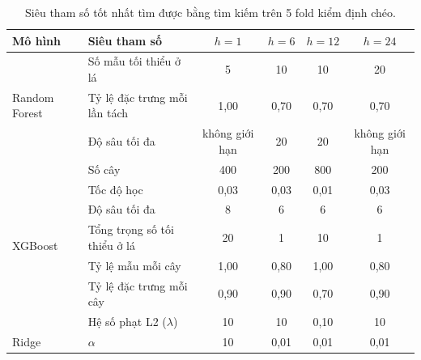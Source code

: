 \begin{table}[htbp]
\centering
\caption[Siêu tham số tối ưu]{Siêu tham số tốt nhất tìm được bằng tìm kiếm trên 5 fold kiểm định chéo.}
\label{tab:best_params}
\footnotesize\setlength{\tabcolsep}{4pt}
\begin{tabular}{|l|l|c|c|c|c|}
\hline
\textbf{Mô hình} & \textbf{Siêu tham số} & \textbf{$h = 1$} & \textbf{$h = 6$} & \textbf{$h = 12$} & \textbf{$h = 24$} \\
\hline
\multirow{3}{*}{Random Forest} & Số mẫu tối thiểu ở lá & 5 & 10 & 10 & 20 \\
\cline{2-6}
 & Tỷ lệ đặc trưng mỗi lần tách & 1{,}00 & 0{,}70 & 0{,}70 & 0{,}70 \\
\cline{2-6}
 & Độ sâu tối đa & không giới hạn & 20 & 20 & không giới hạn \\
\hline
\multirow{7}{*}{XGBoost} & Số cây & 400 & 200 & 800 & 200 \\
\cline{2-6}
 & Tốc độ học & 0{,}03 & 0{,}03 & 0{,}01 & 0{,}03 \\
\cline{2-6}
 & Độ sâu tối đa & 8 & 6 & 6 & 6 \\
\cline{2-6}
 & Tổng trọng số tối thiểu ở lá & 20 & 1 & 10 & 1 \\
\cline{2-6}
 & Tỷ lệ mẫu mỗi cây & 1{,}00 & 0{,}80 & 1{,}00 & 0{,}80 \\
\cline{2-6}
 & Tỷ lệ đặc trưng mỗi cây & 0{,}90 & 0{,}90 & 0{,}70 & 0{,}90 \\
\cline{2-6}
 & Hệ số phạt L2 ($\lambda$) & 10 & 10 & 0{,}10 & 10 \\
\hline
\multirow{1}{*}{Ridge} & $\alpha$ & 10 & 0{,}01 & 0{,}01 & 0{,}01 \\
\hline
\end{tabular}
\end{table}
